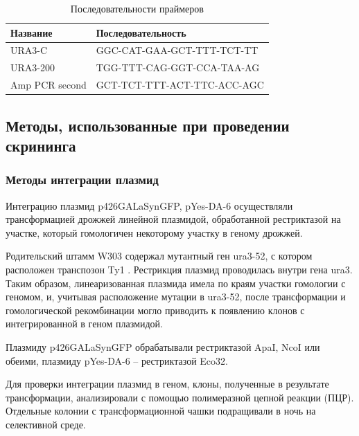 \begin{table}[H]
	\small
	\caption{Последовательности праймеров}
	\label{table:primers}
	\begin{tabular}{p{0.3\width - \tabcolsep}p{0.7\width - \tabcolsep}}
		\graytable
		\toprule
		Название & Последовательность \\
		\midrule
		URA3-C & GGC-CAT-GAA-GCT-TTT-TCT-TT \\
		URA3-200 & TGG-TTT-CAG-GGT-CCA-TAA-AG\\
		Amp PCR second & GCT-TCT-TTT-ACT-TTC-ACC-AGC\\
		
		\bottomrule
	\end{tabular}
\end{table}

\subsection{Методы, использованные при проведении скрининга}
\subsubsection{Методы интеграции плазмид}
\label{subsec:integration}

Интеграцию плазмид p426GALaSynGFP, pYes-DA-6 осуществляли трансформацией дрожжей линейной плазмидой, обработанной рестриктазой на участке, который гомологичен некоторому участку в геному дрожжей.

Родительский штамм W303 содержал мутантный ген ura3-52, с котором расположен транспозон Ty1 \cite{rose_identification_1984}. Рестрикция плазмид проводилась внутри гена ura3. Таким образом, линеаризованная плазмида имела по краям участки гомологии с геномом, и, учитывая расположение мутации в ura3-52, после трансформации и гомологической рекомбинации могло приводить к появлению клонов с интегрированной в геном плазмидой.

Плазмиду p426GALaSynGFP обрабатывали рестриктазой ApaI, NcoI или обеими, плазмиду pYes-DA-6 -- рестриктазой Eco32.

Для проверки интеграции плазмид в геном, клоны, полученные в результате трансформации, анализировали с помощью  полимеразной цепной реакции (ПЦР). Отдельные колонии с трансформационной чашки подращивали в ночь на селективной среде.

